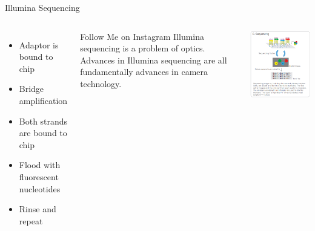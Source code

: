 \documentclass{beamer}
\begin{document}
\begin{frame}{Illumina Sequencing}
	\begin{columns}
			\begin{itemize}
			\item Adaptor is bound to chip
			\item Bridge amplification
			\item Both strands are bound to chip
			\item Flood with fluorescent nucleotides
			\item Rinse and repeat
			\end{itemize}
			\begin{block}{Follow Me on Instagram}
			Illumina sequencing is a problem of optics. Advances in Illumina sequencing are all fundamentally advances in camera technology. 
			\end{block}
			\includegraphics[width=\linewidth]{figures/sequencing.png}
	\end{columns}
\end{frame}
\end{document}
